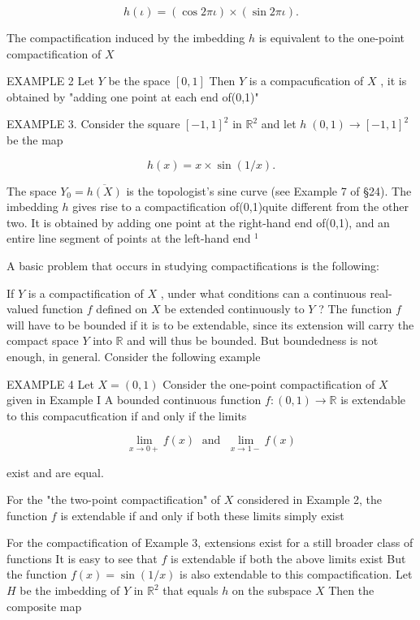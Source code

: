 \[
h\left( \iota \right)  = \left( {\cos {2\pi \iota }}\right)  \times  \left( {\sin {2\pi \iota }}\right) .
\]

The compactification induced by the imbedding \(h\) is equivalent to the one-point compactification of \(X\)

EXAMPLE 2 Let \(Y\) be the space \(\left\lbrack  {0,1}\right\rbrack\) Then \(Y\) is a compacufication of \(X\) , it is obtained by "adding one point at each end of(0,1)"

EXAMPLE 3. Consider the square \({\left\lbrack  -1,1\right\rbrack  }^{2}\) in \({\mathbb{R}}^{2}\) and let \(h\;\left( {0,1}\right)  \rightarrow  {\left\lbrack  -1,1\right\rbrack  }^{2}\) be the map

\[
h\left( x\right)  = x \times  \sin \left( {1/x}\right) .
\]

The space \({Y}_{0} = \overline{h\left( X\right) }\) is the topologist’s sine curve (see Example 7 of §24). The imbedding \(h\) gives rise to a compactification of(0,1)quite different from the other two. It is obtained by adding one point at the right-hand end of(0,1), and an entire line segment of points at the left-hand end \({}^{1}\)

A basic problem that occurs in studying compactifications is the following:

If \(Y\) is a compactification of \(X\) , under what conditions can a continuous real-valued function \(f\) defined on \(X\) be extended continuously to \(Y\) ? The function \(f\) will have to be bounded if it is to be extendable, since its extension will carry the compact space \(Y\) into \(\mathbb{R}\) and will thus be bounded. But boundedness is not enough, in general. Consider the following example

EXAMPLE 4 Let \(X = \left( {0,1}\right)\) Consider the one-point compactification of \(X\) given in Example I A bounded continuous function \(f : \left( {0,1}\right)  \rightarrow  \mathbb{R}\) is extendable to this compacutfication if and only if the limits

\[
\mathop{\lim }\limits_{{x \rightarrow  0 + }}f\left( x\right) \;\text{ and }\;\mathop{\lim }\limits_{{x \rightarrow  1 - }}f\left( x\right)
\]

exist and are equal.

For the "the two-point compactification" of \(X\) considered in Example 2, the function \(f\) is extendable if and only if both these limits simply exist

For the compactification of Example 3, extensions exist for a still broader class of functions It is easy to see that \(f\) is extendable if both the above limits exist But the function \(f\left( x\right)  = \sin \left( {1/x}\right)\) is also extendable to this compactification. Let \(H\) be the imbedding of \(Y\) in \({\mathbb{R}}^{2}\) that equals \(h\) on the subspace \(X\) Then the composite map

